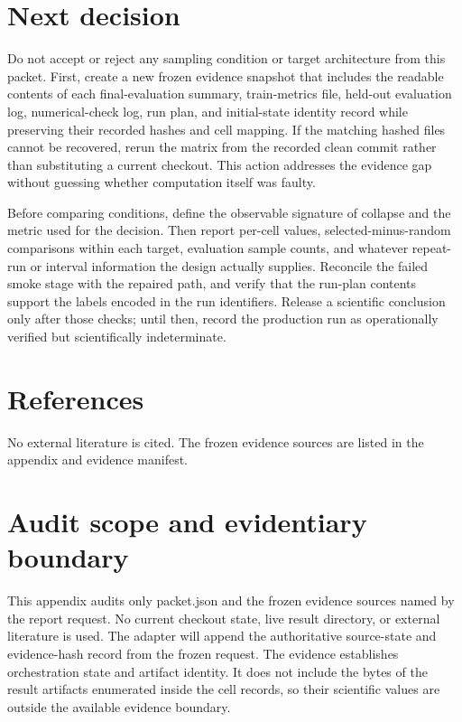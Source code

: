 \documentclass[10pt,twocolumn,letterpaper]{article}
\begin{document}
\section{Next decision}
Do not accept or reject any sampling condition or target architecture from this packet. First, create a new frozen evidence snapshot that includes the readable contents of each final-evaluation summary, train-metrics file, held-out evaluation log, numerical-check log, run plan, and initial-state identity record while preserving their recorded hashes and cell mapping. If the matching hashed files cannot be recovered, rerun the matrix from the recorded clean commit rather than substituting a current checkout. This action addresses the evidence gap without guessing whether computation itself was faulty.

Before comparing conditions, define the observable signature of collapse and the metric used for the decision. Then report per-cell values, selected-minus-random comparisons within each target, evaluation sample counts, and whatever repeat-run or interval information the design actually supplies. Reconcile the failed smoke stage with the repaired path, and verify that the run-plan contents support the labels encoded in the run identifiers. Release a scientific conclusion only after those checks; until then, record the production run as operationally verified but scientifically indeterminate.

\EndMainReport
\section*{References}
No external literature is cited. The frozen evidence sources are listed in the appendix and evidence manifest.

\BeginAppendix
\section{Audit scope and evidentiary boundary}\label{audit-boundary}
This appendix audits only packet.json and the frozen evidence sources named by the report request. No current checkout state, live result directory, or external literature is used. The adapter will append the authoritative source-state and evidence-hash record from the frozen request. The evidence establishes orchestration state and artifact identity. It does not include the bytes of the result artifacts enumerated inside the cell records, so their scientific values are outside the available evidence boundary.
\end{document}
